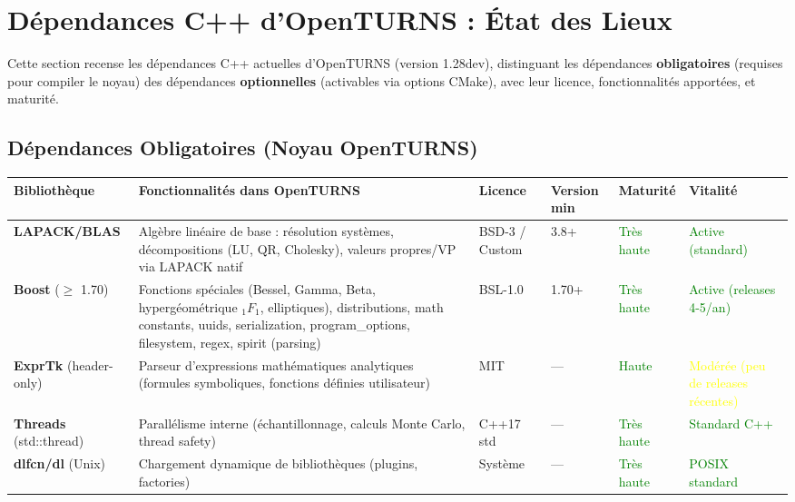 \documentclass[11pt,a4paper]{article}
\begin{document}
\section{Dépendances C++ d'OpenTURNS : État des Lieux}

Cette section recense les dépendances C++ actuelles d'OpenTURNS (version 1.28dev), distinguant les dépendances \textbf{obligatoires} (requises pour compiler le noyau) des dépendances \textbf{optionnelles} (activables via options CMake), avec leur licence, fonctionnalités apportées, et maturité.

\subsection{Dépendances Obligatoires (Noyau OpenTURNS)}

\begin{longtable}{@{}p{2.2cm}p{3.5cm}p{2.5cm}p{1.8cm}p{2.5cm}p{2.5cm}@{}}
\toprule
\textbf{Bibliothèque} & \textbf{Fonctionnalités dans OpenTURNS} & \textbf{Licence} & \textbf{Version min} & \textbf{Maturité} & \textbf{Vitalité} \\
\midrule
\textbf{LAPACK/BLAS} & Algèbre linéaire de base : résolution systèmes, décompositions (LU, QR, Cholesky), valeurs propres/VP via LAPACK natif & BSD-3 / Custom & 3.8+ & \textcolor{green}{Très haute} & \textcolor{green}{Active (standard)} \\
\textbf{Boost} ($\geq$ 1.70) & Fonctions spéciales (Bessel, Gamma, Beta, hypergéométrique ${}_1F_1$, elliptiques), distributions, math constants, uuids, serialization, program\_options, filesystem, regex, spirit (parsing) & BSL-1.0 & 1.70+ & \textcolor{green}{Très haute} & \textcolor{green}{Active (releases 4-5/an)} \\
\textbf{ExprTk} (header-only) & Parseur d'expressions mathématiques analytiques (formules symboliques, fonctions définies utilisateur) & MIT & — & \textcolor{green}{Haute} & \textcolor{yellow}{Modérée (peu de releases récentes)} \\
\textbf{Threads} (std::thread) & Parallélisme interne (échantillonnage, calculs Monte Carlo, thread safety) & C++17 std & — & \textcolor{green}{Très haute} & \textcolor{green}{Standard C++} \\
\textbf{dlfcn/dl} (Unix) & Chargement dynamique de bibliothèques (plugins, factories) & Système & — & \textcolor{green}{Très haute} & \textcolor{green}{POSIX standard} \\
\bottomrule
\end{longtable}
\end{document}
